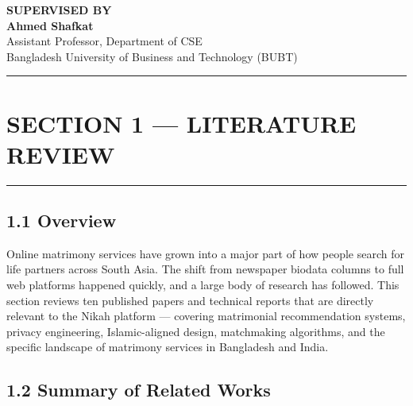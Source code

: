 \documentclass[conference]{IEEEtran}
\begin{document}
\begin{titlepage}
\vspace{2cm}

\begin{center}
    \textbf{SUPERVISED BY}\\[2ex]
    \textbf{Ahmed Shafkat
}\\
    Assistant Professor, Department of CSE\\
    Bangladesh University of Business and Technology (BUBT)
\end{center}

\vspace{0.5cm}

\noindent
\begin{center}
\renewcommand{\arraystretch}{1.2}
\end{center}
\end{titlepage}

\hrule
\vspace{0.5cm}

\section*{SECTION 1 --- LITERATURE REVIEW}
\hrule
\vspace{0.5cm}

\subsection*{1.1 Overview}
Online matrimony services have grown into a major part of how people search for life partners across South Asia. The shift from newspaper biodata columns to full web platforms happened quickly, and a large body of research has followed. This section reviews ten published papers and technical reports that are directly relevant to the Nikah platform --- covering matrimonial recommendation systems, privacy engineering, Islamic-aligned design, matchmaking algorithms, and the specific landscape of matrimony services in Bangladesh and India.

\subsection*{1.2 Summary of Related Works}
\end{document}
